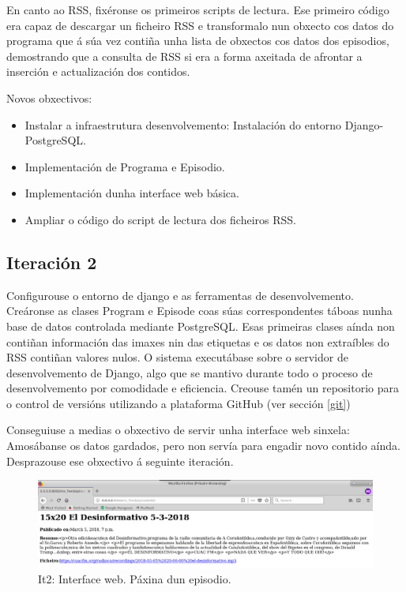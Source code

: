 En canto ao RSS, fixéronse os primeiros scripts de lectura. Ese primeiro código era capaz de descargar un ficheiro RSS e transformalo nun obxecto cos datos do programa que á súa vez contiña unha lista de obxectos cos datos dos episodios, demostrando que a consulta de RSS si era a forma axeitada de afrontar a inserción e actualización dos contidos.

Novos obxectivos:

\begin{itemize}
	\item Instalar a infraestrutura desenvolvemento: Instalación do entorno Django-PostgreSQL.
	\item Implementación de Programa e Episodio.
	\item Implementación dunha interface web básica.
	\item Ampliar o código do script de lectura dos ficheiros RSS.
\end{itemize}

\subsection{Iteración 2}

Configurouse o entorno de django e as ferramentas de desenvolvemento. Creáronse as clases Program e Episode coas súas correspondentes táboas nunha base de datos controlada mediante PostgreSQL. Esas primeiras clases aínda non contiñan información das imaxes nin das etiquetas e os datos non extraíbles do RSS contiñan valores nulos. O sistema executábase sobre o servidor de desenvolvemento de Django, algo que se mantivo durante todo o proceso de desenvolvemento por comodidade e eficiencia. Creouse tamén un repositorio para o control de versións utilizando a plataforma GitHub (ver sección \ref{git})

Conseguiuse a medias o obxectivo de servir unha interface web sinxela: Amosábanse os datos gardados, pero non servía para engadir novo contido aínda. Desprazouse ese obxectivo á seguinte iteración.

\begin{figure}[h]
	\centering
	\includegraphics[scale=0.3,keepaspectratio=true]{./images/it2_episode.png}
	\caption{It2: Interface web. Páxina dun episodio.}
	\label{fig:it2_episode}
\end{figure}

